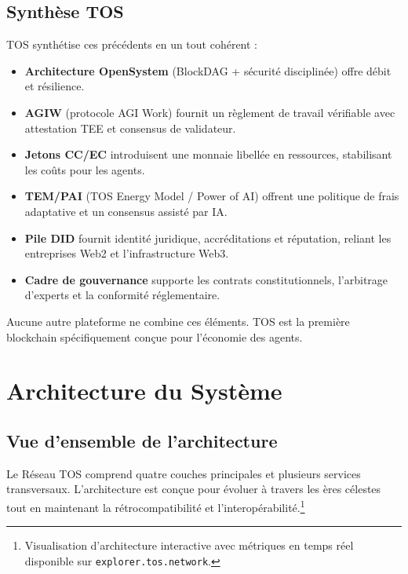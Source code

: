 \documentclass[11pt]{article}
\begin{document}
\subsection{Synthèse TOS}
TOS synthétise ces précédents en un tout cohérent :
\begin{itemize}[noitemsep]
  \item \textbf{Architecture OpenSystem} (BlockDAG + sécurité disciplinée) offre débit et résilience.
  \item \textbf{AGIW} (protocole AGI Work) fournit un règlement de travail vérifiable avec attestation TEE et consensus de validateur.
  \item \textbf{Jetons CC/EC} introduisent une monnaie libellée en ressources, stabilisant les coûts pour les agents.
  \item \textbf{TEM/PAI} (TOS Energy Model / Power of AI) offrent une politique de frais adaptative et un consensus assisté par IA.
  \item \textbf{Pile DID} fournit identité juridique, accréditations et réputation, reliant les entreprises Web2 et l'infrastructure Web3.
  \item \textbf{Cadre de gouvernance} supporte les contrats constitutionnels, l'arbitrage d'experts et la conformité réglementaire.
\end{itemize}

Aucune autre plateforme ne combine ces éléments. TOS est la première blockchain spécifiquement conçue pour l'économie des agents.

\section{Architecture du Système}
\subsection{Vue d'ensemble de l'architecture}
Le Réseau TOS comprend quatre couches principales et plusieurs services transversaux. L'architecture est conçue pour évoluer à travers les ères célestes tout en maintenant la rétrocompatibilité et l'interopérabilité.\footnote{Visualisation d'architecture interactive avec métriques en temps réel disponible sur \texttt{explorer.tos.network}.}
\end{document}

